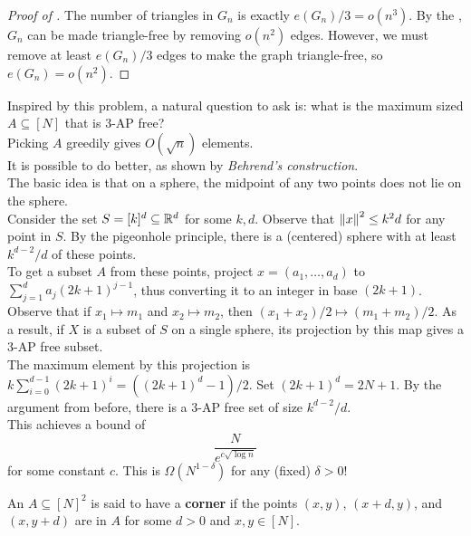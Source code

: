 			\begin{proof}[Proof of ]
				The number of triangles in $G_n$ is exactly $e(G_n)/3 = o(n^3)$. By the , $G_n$ can be made triangle-free by removing $o(n^2)$ edges. However, we must remove at least $e(G_n)/3$ edges to make the graph triangle-free, so $e(G_n) = o(n^2)$.
			\end{proof}

			Inspired by this problem, a natural question to ask is: what is the maximum sized $A\subseteq[N]$ that is $3$-AP free?\\
			Picking $A$ greedily gives $O(\sqrt{n})$ elements.\\
			
			It is possible to do better, as shown by \emph{Behrend's construction}.\\
			The basic idea is that on a sphere, the midpoint of any two points does not lie on the sphere.\\
			Consider the set $S = [k]^d\subseteq\mathbb{R}^d$ for some $k,d$. Observe that $\left\lVert x\right\rVert^2 \le k^2 d$ for any point in $S$. By the pigeonhole principle, there is a (centered) sphere with at least $k^{d-2}/d$ of these points.\\
			To get a subset $A$ from these points, project $x = (a_1,\ldots,a_d)$ to $\sum_{j=1}^d a_j (2k+1)^{j-1}$, thus converting it to an integer in base $(2k+1)$. Observe that if $x_1 \mapsto m_1$ and $x_2 \mapsto m_2$, then $(x_1 + x_2)/2 \mapsto (m_1 + m_2)/2$. As a result, if $X$ is a subset of $S$ on a single sphere, its projection by this map gives a $3$-AP free subset.\\
			The maximum element by this projection is $k\sum_{i=0}^{d-1} (2k+1)^{i} = ((2k+1)^d - 1)/2$. Set $(2k+1)^d = 2N+1$. By the argument from before, there is a $3$-AP free set of size $k^{d-2}/d$.\\
			This achieves a bound of
			\[ \frac{N}{e^{c\sqrt{\log n}}} \]
			for some constant $c$. This is $\Omega(N^{1-\delta})$ for any (fixed) $\delta>0$!\\

			\begin{definition}[Corner]
				An $A\subseteq[N]^2$ is said to have a \textbf{corner} if the points $(x,y)$, $(x+d,y)$, and $(x,y+d)$ are in $A$ for some $d>0$ and $x,y\in[N]$.
			\end{definition}

